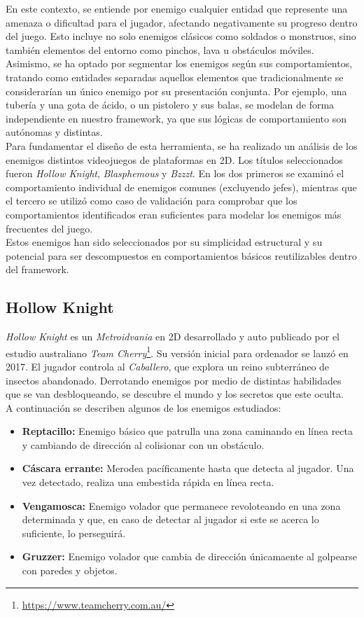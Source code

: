 En este contexto, se entiende por enemigo cualquier entidad que represente una amenaza o dificultad para el jugador, afectando negativamente su progreso dentro del juego. Esto incluye no solo enemigos clásicos como soldados o monstruos, sino también elementos del entorno como pinchos, lava u obstáculos móviles. Asimismo, se ha optado por segmentar los enemigos según sus comportamientos, tratando como entidades separadas aquellos elementos que tradicionalmente se considerarían un único enemigo por su presentación conjunta. Por ejemplo, una tubería y una gota de ácido, o un pistolero y sus balas, se modelan de forma independiente en nuestro framework, ya que sus lógicas de comportamiento son autónomas y distintas.\\

Para fundamentar el diseño de esta herramienta, se ha realizado un análisis de los enemigos distintos videojuegos de plataformas en 2D. Los títulos seleccionados fueron \textit{Hollow Knight}, \textit{Blasphemous} y \textit{Bzzzt}. En los dos primeros se examinó el comportamiento individual de enemigos comunes (excluyendo jefes), mientras que el tercero se utilizó como caso de validación para comprobar que los comportamientos identificados eran suficientes para modelar los enemigos más frecuentes del juego.\\

Estos enemigos han sido seleccionados por su simplicidad estructural y su potencial para ser descompuestos en comportamientos básicos reutilizables dentro del framework.
\subsection{Hollow Knight}
\textit{Hollow Knight} es un \emph{Metroidvania} en 2D desarrollado y auto publicado por el estudio australiano \emph{Team Cherry}\footnote{\url{https://www.teamcherry.com.au/}}. Su versión inicial para ordenador se lanzó en 2017. El jugador controla al \textit{Caballero}, que explora un reino subterráneo de insectos abandonado. Derrotando enemigos por medio de distintas habilidades que se van desbloqueando, se descubre el mundo y los secretos que este oculta.\\

A continuación se describen algunos de los enemigos estudiados:
\begin{itemize}
	\item \textbf{Reptacillo:} Enemigo básico que patrulla una zona caminando en línea recta y cambiando de dirección al colisionar con un obstáculo.
	\item \textbf{Cáscara errante:} Merodea pacíficamente hasta que detecta al jugador. Una vez detectado, realiza una embestida rápida en línea recta. 
	\item \textbf{Vengamosca:} Enemigo volador que permanece revoloteando en una zona determinada y que, en caso de detectar al jugador si este se acerca lo suficiente, lo perseguirá.
	\item \textbf{Gruzzer:} Enemigo volador que cambia de dirección únicamaente al golpearse con paredes y objetos.
\end{itemize}


